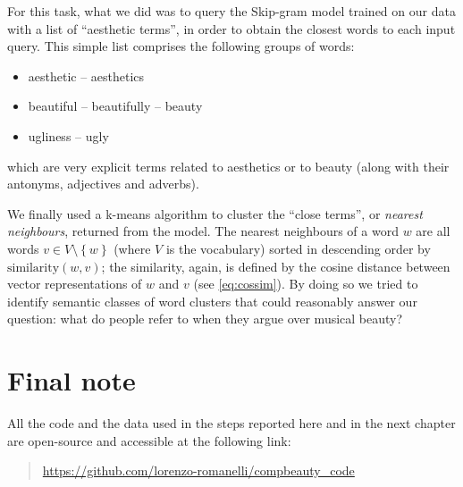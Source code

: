 For this task, what we did was to query the Skip-gram model trained on our data with a list of ``aesthetic terms'', in order to obtain the closest words to each input query. This simple list comprises the following groups of words:
\begin{itemize}
	\item aesthetic -- aesthetics
	\item beautiful -- beautifully -- beauty
	\item ugliness -- ugly
\end{itemize}
which are very explicit terms related to aesthetics or to beauty (along with their antonyms, adjectives and adverbs).

We finally used a k-means algorithm to cluster the ``close terms'', or \emph{nearest neighbours}, returned from the model. The nearest neighbours of a word $w$ are all words $v \in V \setminus \left\{w\right\}$ (where $V$ is the vocabulary) sorted in descending order by $\text{similarity}(w,v)$; the similarity, again, is defined by the cosine distance between vector representations of $w$ and $v$ (see \autoref{eq:cossim}). By doing so we tried to identify semantic classes of word clusters that could reasonably answer our question: what do people refer to when they argue over musical beauty?

\section{Final note}
All the code and the data used in the steps reported here and in the next chapter are open-source and accessible at the following link:
\begin{quote}
	\url{https://github.com/lorenzo-romanelli/compbeauty_code}
\end{quote}
























